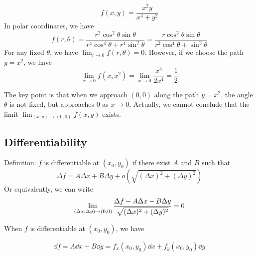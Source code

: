 \documentclass[a4]{overview}
\begin{document}
\begin{example}
	\[
		f(x, y) = \frac{x^2y}{x^4+y^2}
	\] 
In polar coordinates, we have
\[
	f(r, \theta) = \frac{r^2 \cos^2 \theta \sin \theta}{r^4 \cos^4 \theta + r^4 \sin^2 \theta}
	= \frac{r\cos^2 \theta \sin \theta}{r^2 \cos^4 \theta + \sin^2 \theta}
\]
For any fixed $\theta$, we have $\lim_{r \to 0} f(r, \theta) = 0$.
However, if we choose the path $y = x^2$, we have
\[
	\lim_{x \to 0} f(x, x^2) = \lim_{x \to 0} \frac{x^{4}}{2x^{4}} = \frac{1}{2}
\]

The key point is that when we approach $(0,0)$ along the path $y = x^2$, the
angle $\theta$ is not fixed, but approaches $0$ as $x \to 0$. Actually, we
cannot conclude that the limit $\lim_{(x,y) \to (0,0)} f(x,y)$ exists.
	
\end{example}

\subsection{Differentiability}

Definition:
$f$ is differentiable at $(x_0,y_0)$ if there exist $A$ and $B$ such that
\[
	\Delta f = A \Delta x + B \Delta y + o(\sqrt{(\Delta x)^2 + (\Delta y)^2})
\] 
Or equivalently, we can write
\[
	\lim_{(\Delta x, \Delta y)\to(0, 0)}
	\frac{\Delta f - A \Delta x - B \Delta y}{\sqrt{(\Delta x)^2 + (\Delta y)^2}} = 0
\]

When $f$ is differentiable at $(x_0,y_0)$, we have

\[
\dd f = A \dd x + B \dd y = f_x(x_0,y_0) \dd x + f_y(x_0,y_0) \dd y
\] 
\end{document}
